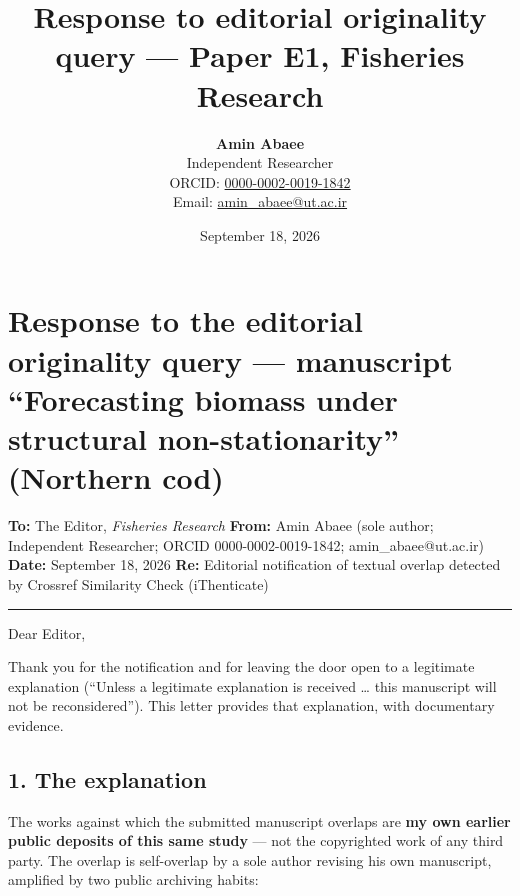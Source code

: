 \documentclass[11pt]{article}
\title{Response to editorial originality query — Paper E1, Fisheries Research}
\author{\textbf{Amin Abaee}\\ Independent Researcher\\[2pt] ORCID: \href{https://orcid.org/0000-0002-0019-1842}{0000-0002-0019-1842}\\ Email: \href{mailto:amin_abaee@ut.ac.ir}{amin_abaee@ut.ac.ir}}
\date{September 18, 2026}
\begin{document}
\maketitle

\section{Response to the editorial originality query --- manuscript
``Forecasting biomass under structural non-stationarity'' (Northern
cod)}\label{response-to-the-editorial-originality-query-manuscript-forecasting-biomass-under-structural-non-stationarity-northern-cod}

\textbf{To:} The Editor, \emph{Fisheries Research} \textbf{From:} Amin
Abaee (sole author; Independent Researcher; ORCID 0000-0002-0019-1842;
amin\_abaee@ut.ac.ir) \textbf{Date:} September 18, 2026 \textbf{Re:}
Editorial notification of textual overlap detected by Crossref
Similarity Check (iThenticate)

\begin{center}\rule{0.5\linewidth}{0.5pt}\end{center}

Dear Editor,

Thank you for the notification and for leaving the door open to a
legitimate explanation (``Unless a legitimate explanation is received
\ldots{} this manuscript will not be reconsidered''). This letter
provides that explanation, with documentary evidence.

\subsection{1. The explanation}\label{the-explanation}

The works against which the submitted manuscript overlaps are \textbf{my
own earlier public deposits of this same study} --- not the copyrighted
work of any third party. The overlap is self-overlap by a sole author
revising his own manuscript, amplified by two public archiving habits:
\end{document}
